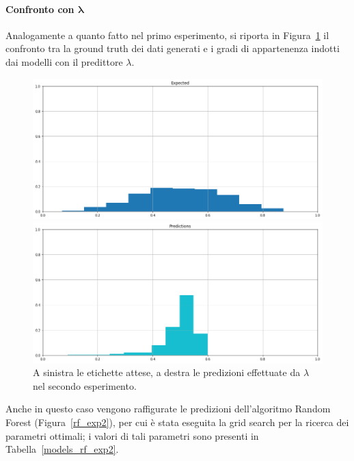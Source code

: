 \documentclass[12pt]{report}
\theoremstyle{definition}
\begin{document}
\paragraph{Confronto con $\bm{\lambda}$}
Analogamente a quanto fatto nel primo esperimento, si riporta in Figura~\ref{prediction_exp2} il confronto tra la ground truth dei dati generati e i gradi di appartenenza indotti dai modelli con il predittore $\lambda$.
\begin{figure}
\centering
    \begin{minipage}{0.48\textwidth}
        \includegraphics[width=\linewidth]{images/experiment_beta5_disgiunti/expected_memberships.png}
    \end{minipage}
    \begin{minipage}{0.48\textwidth}
        \includegraphics[width=\linewidth]{images/experiment_beta5_disgiunti/prediction_memberships.png}
    \end{minipage}
    \caption{A sinistra le etichette attese, a destra le predizioni effettuate da $\lambda$ nel secondo esperimento.}
    \label{prediction_exp2}
\end{figure} 

Anche in questo caso vengono raffigurate le predizioni dell'algoritmo Random Forest (Figura~\ref{rf_exp2}), per cui è stata eseguita la grid search per la ricerca dei parametri ottimali; i valori di tali parametri sono presenti in Tabella~\ref{models_rf_exp2}.
\end{document}
